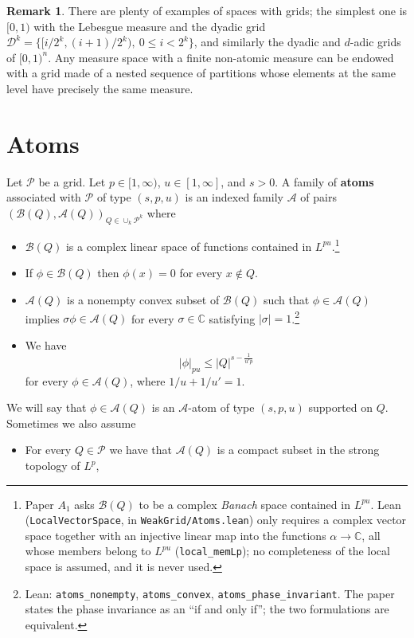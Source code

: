 \documentclass[11pt]{amsart}
\theoremstyle{definition}
\newtheorem{remark}[theorem]{Remark}
\newcommand{\lean}[1]{\texttt{#1}}
\begin{document}
\begin{remark}
There are plenty of examples of spaces with grids; the simplest one is
$[0,1)$ with the Lebesgue measure and the dyadic grid
$\mathcal{D}^k=\{[i/2^k,(i+1)/2^k),\ 0\leq i< 2^k\}$, and similarly the dyadic
and $d$-adic grids of $[0,1)^n$. Any measure space with a finite non-atomic
measure can be endowed with a grid made of a nested sequence of partitions
whose elements at the same level have precisely the same measure.
\end{remark}

\section{Atoms}\label{secatoms}

Let $\mathcal{P}$ be a grid. Let $p \in [1,\infty)$, $u \in [1,\infty]$, and
$s>0$. A family of {\bf atoms} associated with $\mathcal{P}$ of type $(s,p,u)$
is an indexed family $\mathcal{A}$ of pairs
$(\mathcal{B}(Q),\mathcal{A}(Q))_{Q\in \cup_k \mathcal{P}^k}$ where
\begin{itemize}
\item[$A_1$.] $\mathcal{B}(Q)$ is a complex linear space of functions
contained in $L^{pu}$.\footnote{Paper $A_1$ asks $\mathcal{B}(Q)$ to be a
complex \emph{Banach} space contained in $L^{pu}$. Lean
(\lean{LocalVectorSpace}, in \lean{WeakGrid/Atoms.lean}) only requires a
complex vector space together with an injective linear map into the functions
$\alpha \to \mathbb{C}$, all whose members belong to $L^{pu}$
(\lean{local\_memLp}); no completeness of the local space is assumed, and it
is never used.}
\item[$A_2$.] If $\phi \in \mathcal{B}(Q)$ then $\phi(x)=0$ for every
$x \not\in Q$.
\item[$A_3$.] $\mathcal{A}(Q)$ is a nonempty convex subset of $\mathcal{B}(Q)$
such that $\phi \in \mathcal{A}(Q)$ implies
$\sigma\phi\in\mathcal{A}(Q)$ for every $\sigma \in \mathbb{C}$ satisfying
$|\sigma|=1$.\footnote{Lean: \lean{atoms\_nonempty}, \lean{atoms\_convex},
\lean{atoms\_phase\_invariant}. The paper states the phase invariance as an
``if and only if''; the two formulations are equivalent.}
\item[$A_4$.] We have $$|\phi|_{pu} \leq |Q|^{s-\frac{1}{u'p}}$$ for every
$\phi \in \mathcal{A}(Q)$, where $1/u + 1/u' = 1$.
\end{itemize}
We will say that $\phi \in \mathcal{A}(Q)$ is an $\mathcal{A}$-atom of type
$(s,p,u)$ supported on $Q$. Sometimes we also assume
\begin{itemize}
\item[$A_5$.] For every $Q\in \mathcal{P}$ we have that $\mathcal{A}(Q)$ is a
compact subset in the strong topology of $L^p$,
\end{itemize}
\end{document}
